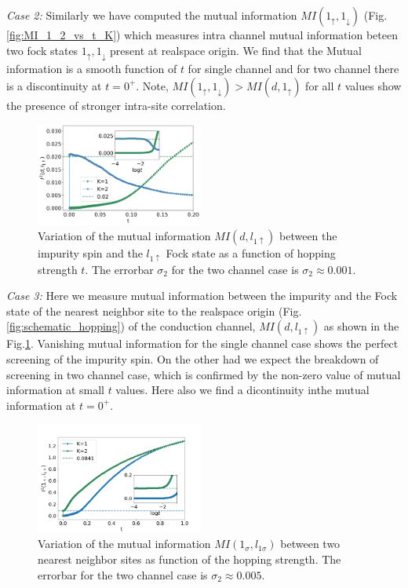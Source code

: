 \documentclass[reprint,prb,superscriptaddress]{revtex4-1}
\begin{document}
\par\textit{Case 2:} Similarly we have computed the mutual information $MI(1_{\uparrow},1_{\downarrow})$ (Fig.\ref{fig:MI_1_2_vs_t_K}) which measures intra channel  mutual information beteen two fock states $1_{\uparrow},1_{\downarrow}$ present at realspace origin. We find that the Mutual information is a smooth function of $t$ for single channel and for two channel there is a discontinuity at $t=0^{+}$. Note, $MI(1_{\uparrow},1_{\downarrow})>MI(d,1_{\uparrow})$ for all $t$ values show the presence of stronger intra-site correlation.
\begin{figure}
\includegraphics[width=0.49\textwidth]{plt/A_I2_ch12_['d','l1_up']}
\caption{Variation of the mutual information $MI(d,l_{1\uparrow})$ between the impurity spin and the $l_{1\uparrow}$ Fock state as a function of hopping strength $t$. The errorbar $\sigma_2$ for the two channel case is $\sigma_2\approx 0.001$.}
\label{fig:MI_d_l1}
\end{figure}
\par \textit{Case 3:} Here we measure mutual information between the impurity and the Fock state of the nearest neighbor site to the realspace origin (Fig.\ref{fig:schematic_hopping}) of the conduction channel, $MI(d,l_{1\uparrow})$ as shown in the Fig.\ref{fig:MI_d_l1}. Vanishing mutual information for the single channel case shows the perfect screening of the impurity spin. On the other had we expect the breakdown of screening in two channel case, which is confirmed by the non-zero value of mutual information at small $t$ values. Here also we find a dicontinuity inthe mutual information at $t=0^+$.
\begin{figure}[!htpb]
\includegraphics[width=0.49\textwidth]{plt/A_I2_ch12_['1','l1']}
\caption{Variation of the mutual information $MI(1_{\sigma},l_{1\sigma})$ between two nearest neighbor sites as function of the hopping strength. The errorbar for the two channel case is $\sigma_2\approx 0.005$.}
\label{fig:MI_l_l1}
\end{figure}
\end{document}

